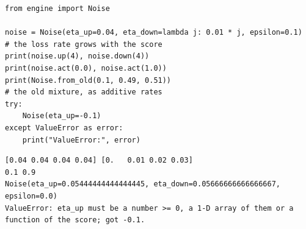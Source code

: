 \begin{lstlisting}[style=code]
from engine import Noise

noise = Noise(eta_up=0.04, eta_down=lambda j: 0.01 * j, epsilon=0.1)    # the loss rate grows with the score
print(noise.up(4), noise.down(4))
print(noise.act(0.0), noise.act(1.0))
print(Noise.from_old(0.1, 0.49, 0.51))                                  # the old mixture, as additive rates
try:
    Noise(eta_up=-0.1)
except ValueError as error:
    print("ValueError:", error)
\end{lstlisting}
\begin{lstlisting}[style=output]
[0.04 0.04 0.04 0.04] [0.   0.01 0.02 0.03]
0.1 0.9
Noise(eta_up=0.05444444444444445, eta_down=0.05666666666666667, epsilon=0.0)
ValueError: eta_up must be a number >= 0, a 1-D array of them or a function of the score; got -0.1.
\end{lstlisting}
